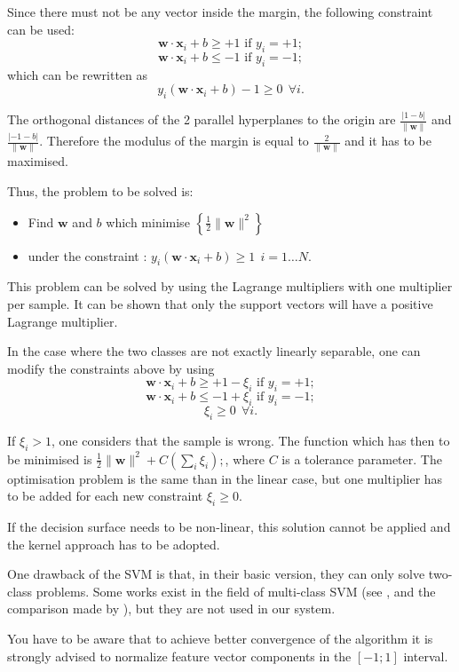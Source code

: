 Since there must not be any vector inside the margin, the following
constraint can be used:
    $$\mathbf{w}\cdot\mathbf{x}_i+b\ge +1\text{ if }y_i=+1;$$
    $$\mathbf{w}\cdot\mathbf{x}_i+b\le -1\text{ if }y_i=-1;$$ which
    can be rewritten as $$y_i(\mathbf{w}\cdot\mathbf{x}_i+b)-1\ge 0~  ~ \forall i.$$

    The orthogonal distances of the 2 parallel hyperplanes to the
    origin are $\frac{|1-b|}{\|\mathbf{w}\|}$ and
      $\frac{|-1-b|}{\|\mathbf{w}\|}$. Therefore the modulus of the
    margin is equal to $\frac{2}{\|\mathbf{w}\|}$ and it has to be
    maximised.

    Thus, the problem to be solved is:

	\begin{itemize}
	\item Find $\mathbf{w}$ and $b$ which minimise
	 $\left\{ \frac{1}{2}\|\mathbf{w}\|^2 \right\}$
	\item under the constraint :
	 $y_i(\mathbf{w}\cdot\mathbf{x}_i+b)\ge 1~  ~ i=1\ldots N.$
	\end{itemize}

	This problem can be solved by using the Lagrange multipliers
	with one multiplier per sample. It can be shown that only the
	support vectors will have a positive Lagrange multiplier.

	In the case where the two classes are not exactly linearly
	separable, one can modify the constraints above by using 
      $$\mathbf{w}\cdot\mathbf{x}_i+b\ge +1 - \xi_i \text{ if }y_i=+1;$$
    $$\mathbf{w}\cdot\mathbf{x}_i+b\le -1+\xi_i \text{ if }y_i=-1;$$
    $$\xi_i\ge 0~  ~\forall i.$$

	If $\xi_i > 1$, one considers that the sample is wrong. The
	function which has then to be minimised is
	$\frac{1}{2}\|\mathbf{w}\|^2 + C\left( \sum_i \xi_i\right); $,
	where $C$ is a tolerance parameter. The optimisation problem
	is the same than in the linear case, but one multiplier has to
	be added for each new constraint $\xi_i\ge 0$.

	If the decision surface needs to be non-linear, this solution
	cannot be applied and the kernel approach has to be adopted.


One drawback of the SVM is that, in their basic version, they can only
solve two-class problems. Some works exist in the field of multi-class
SVM (see \cite{allwein00reducing,weston98multiclass}, and the
comparison made by \cite{hsu01comparison}), but they are
not used in our system.

You have to be aware that to achieve better convergence of the algorithm it is 
strongly advised to normalize feature vector components in the $[-1;1]$ 
interval.

